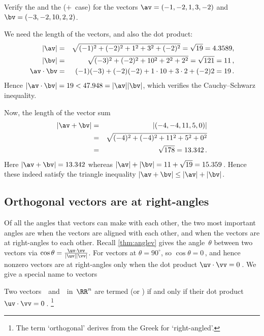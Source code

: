 \begin{example} 
Verify the  and the  (\(+\)~case) for the vectors \(\av=(-1,-2,1,3,-2)\) and \(\bv=(-3,-2,10,2,2)\).
\begin{solution} 
We need the length of the vectors, and also the dot product:
\begin{eqnarray*}
|\av|&=&\sqrt{(-1)^2+(-2)^2+1^2+3^2+(-2)^2}
=\sqrt{19}=4.3589,
\\|\bv|&=&\sqrt{(-3)^2+(-2)^2+10^2+2^2+2^2}
=\sqrt{121}=11\,,
\\
\av\cdot\bv
&=&(-1)(-3)+(-2)(-2)+1\cdot10+3\cdot2+(-2)2
=19\,.
\end{eqnarray*}
Hence \(|\av\cdot\bv|=19<47.948=|\av||\bv|\), which verifies the Cauchy--Schwarz inequality.

Now, the length of the vector sum
\begin{eqnarray*}
|\av+\bv|&=&|(-4,-4,11,5,0)|
\\&=&\sqrt{(-4)^2+(-4)^2+11^2+5^2+0^2}
\\&=&\sqrt{178}=13.342\,.
\end{eqnarray*}
Here \(|\av+\bv|=13.342\) whereas \(|\av|+|\bv|=11+\sqrt{19}=15.359\)\,.
Hence these indeed satisfy the triangle inequality \(|\av+\bv|\leq|\av|+|\bv|\).
\end{solution}
\end{example}








\subsection{Orthogonal vectors are at right-angles}
\label{sec:ovra}


Of all the angles that vectors can make with each other, the two most important angles are when the vectors are aligned with each other, and when the vectors are at right-angles to each other.
Recall \cref{thm:anglev} gives the angle~\(\theta\) between two vectors via \(\cos\theta=\frac{\uv\cdot\vv}{|\uv||\vv|}\).
For vectors at  \(\theta=90^\circ\),  so \(\cos\theta=0\)\,, and hence nonzero vectors are at right-angles only when the dot product \(\uv\cdot\vv=0\)\,.
We give a special name to vectors 


\begin{definition} \label{def:orthovec}
Two vectors~\uv\ and~\vv\ in~\(\RR^n\) are termed
 (or )
if and only if their dot product \(\uv\cdot\vv=0\)\,.
\footnote{The term `orthogonal' derives from the Greek for `right-angled'.}
\end{definition}


